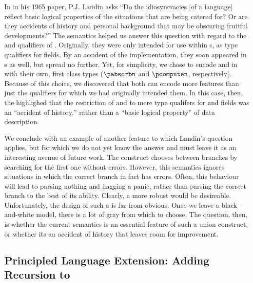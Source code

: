 In in his 1965 paper, P.J. Landin asks ``Do the idiosyncracies [of a
language] reflect basic logical properties of the situations that are
being catered for?  Or are they accidents of history and personal
background that may be obscuring fruitful developments?''  The
semantics helped us answer this question with regard to the \Pomit{}
and \Pcompute{} qualifiers of \pads{}.  Originally, they were only
intended for use within \Pstruct{}s, as type qualifiers for fields.
By an accident of the implementation, they soon appeared in \Punion{}s
as well, but spread no further. Yet, for simplicity, we chose to
encode \Pomit{} and \Pcompute{} in \ddc{} with their own, first class
types ($\pabsorbn$ and $\pcomputen$, respectively). Because of this
choice, we discovered that both can encode more \pads{} features than
just the qualifiers for which we had originally intended them. In this
case, then, the \ddc{} highlighed that the restriction of \Pomit{} and
\Pcompute{} to mere type qualifers for \Punion{} and \Pstruct{} fields
was an ``accident of history,'' rather than a ``basic logical
property'' of data description.

We conclude with an example of another feature to which Landin's
question applies, but for which we do not yet know the answer and must
leave it as an interesting avenue of future work. The \Punion{}
construct chooses between branches by searching for the first one
without errors. However, this semantics ignores situations in which
the correct branch in fact has errors. Often, this behaviour will lead
to parsing nothing and flagging a panic, rather than parsing the
correct branch to the best of its ability. Clearly, a more robust
\Punion{} would be desireable. Unfortunately, the design of such a
\Punion{} is far from obvious. Once we leave a black-and-white model,
there is a lot of gray from which to choose. The question, then, is
whether the current semantics is an essential feature of such a union
construct, or whether its an accident of history that leaves room for
improvement.

\subsection{Principled Language Extension: Adding Recursion to \pads{}}

